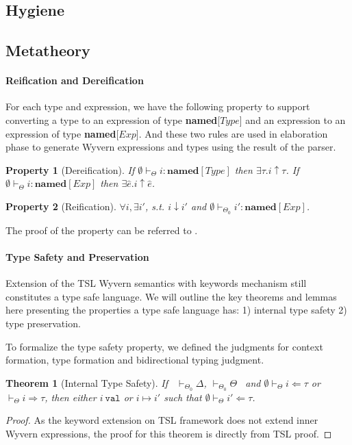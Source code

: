 \documentclass{sig-alternate}
\newtheorem{theorem}{Theorem}
\newtheorem{property}{Property}
\begin{document}
\subsection{Hygiene}

\subsection{Metatheory}
\paragraph{Reification and Dereification}
For each type and expression, we have the following property to support converting a type to an expression of type \textbf{named}[$Type$] and an expression to an expression of type \textbf{named}[$Exp$]. And these two rules are used in elaboration phase to generate Wyvern expressions and types using the result of the parser.
\begin{property}[Dereification]
If $\emptyset\vdash_{\Theta} i:\mathbf{named}[Type]$ then $\exists\tau. i\uparrow\tau$. If $\emptyset\vdash_{\Theta} i:\mathbf{named}[Exp]$ then $\exists\hat{e}. i\uparrow\hat{e}$.
\end{property}
\begin{property}[Reification]
$\forall i, \exists i'$, s.t. $i\downarrow i'$ and $\emptyset\vdash_{\Theta_0} i':\mathbf{named}[Exp]$.
\end{property}
The proof of the property can be referred to .

\paragraph{Type Safety and Preservation}
Extension of the TSL Wyvern semantics with keywords mechanism still constitutes a type safe language. We will outline the key theorems and lemmas here presenting the properties a type safe language has: 1) internal type safety 2) type preservation. 

To formalize the type safety property, we defined the judgments for context formation, type formation and bidirectional typing judgment. 

\begin{theorem}[Internal Type Safety]
If ~$\vdash_{\Theta_0}\Delta$, $\vdash_{\Theta_0}\Theta$~ and $\emptyset\vdash_{\Theta}i\Leftarrow\tau$ or $\vdash_{\Theta}i\Rightarrow\tau$, then either $i~\texttt{val}$ or $i\mapsto i'$ such that $\emptyset\vdash_{\Theta}i'\Leftarrow\tau$.
\end{theorem}
\begin{proof}
As the keyword extension on TSL framework does not extend inner Wyvern expressions, the proof for this theorem is directly from TSL proof. 
\end{proof}
\end{document}
